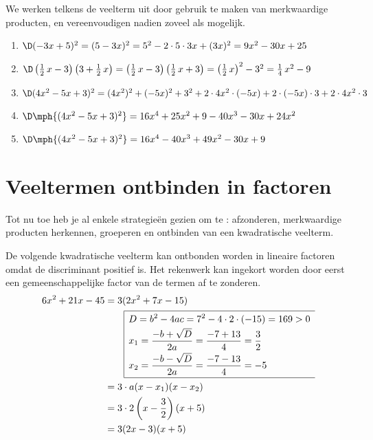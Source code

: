 \documentclass{ximera}
\begin{document}
\begin{example}
We werken telkens de veelterm uit door gebruik te maken van merkwaardige producten, en vereenvoudigen nadien zoveel als mogelijk.
\begin{enumerate}

\item 
$\D (-3x+5)^2 = (5-3x)^2 = 5^2 - 2 \cdot 5 \cdot 3x + (3x)^2 = 9x^2 - 30x + 25$
\item 
$\D \left(\frac{1}{2}\,x-3\right)\left(3+\frac{1}{2}\,x\right) = \left(\frac{1}{2}\,x-3\right)\left(\frac{1}{2}\,x+3\right) = \left(\frac{1}{2}\,x\right)^2 - 3^2 = \frac{1}{4}\,x^2 - 9$
\item
$\D (4x^2 - 5x + 3)^2 = (4x^2)^2 + (-5x)^2 + 3^2 + 2 \cdot 4x^2 \cdot (-5x) + 2\cdot (-5x) \cdot 3 + 2 \cdot 4x^2 \cdot 3$
\item[]
$\D \mph{(4x^2 - 5x + 3)^2} = 16x^4 + 25x^2 + 9 -40x^3 - 30x + 24x^2$
\item[]
$\D \mph{(4x^2 - 5x + 3)^2} = 16x^4 - 40x^3 + 49x^2 - 30x + 9$
\end{enumerate}
\end{example} 

\section{Veeltermen ontbinden in factoren}

Tot nu toe heb je al enkele strategie\"en gezien om te : afzonderen, merkwaardige producten herkennen, groeperen en ontbinden van een kwadratische veelterm.

\begin{example}
De volgende kwadratische veelterm kan ontbonden worden in lineaire factoren omdat de discriminant positief is. Het rekenwerk kan ingekort worden door eerst een gemeenschappelijke factor van de termen af te zonderen. 
\begin{align*}
6x^2+21x-45 & = 3(2x^2 + 7x - 15) \\
& \qquad 
\begin{array}{|l}
\hline
\begin{aligned}
\vrule height 0.4cm width 0cm
& D = b^2 - 4ac = 7^2-4\cdot 2 \cdot (-15) = 169 > 0 \\[0.1cm] 
& x_{1} = \frac{-b + \sqrt{D}}{2a} = \frac{-7 + 13}{4} = \frac{3}{2} \\[0.1cm] 
& x_{2} = \frac{-b - \sqrt{D}}{2a} = \frac{-7 - 13}{4} = -5 \\[0.1cm]
\end{aligned} \\
\hline
\end{array} \\
& = 3 \cdot a(x-x_1)(x-x_2) \\
& = 3 \cdot 2\left(x- \frac{3}{2}\right)(x+5) \\
& = 3(2x-3)(x+5)
\end{align*}
\end{example}
\end{document}
